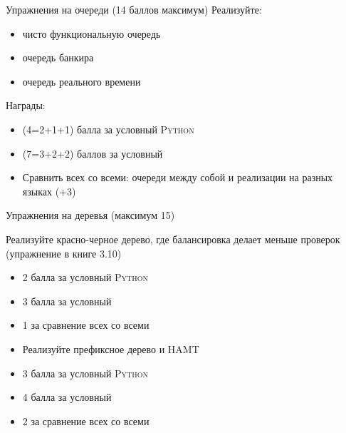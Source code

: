 \begin{frame}{Упражнения на очереди (14 баллов максимум)}
Реализуйте:
\begin{itemize}
\item чисто функциональную очередь 
\item очередь банкира 
\item очередь реального времени 
\end{itemize}
Награды:
\begin{itemize}
\item (4=2+1+1) балла за условный \textsc{Python}
\item (7=3+2+2) баллов за условный \OCaml{}
\item Сравнить всех со всеми: очереди между собой и реализации на разных языках (+3)
\end{itemize}
\end{frame}


%
%
%


\begin{frame}{Упражнения на деревья (максимум 15)}
\begin{exercise}
Реализуйте красно-черное дерево, где балансировка делает меньше проверок (упражнение в книге 3.10) \\
\begin{itemize}
\item 2 балла за условный \textsc{Python}
\item 3 балла за условный \OCaml{}
\item 1 за сравнение всех со всеми
\end{itemize}
\end{exercise}
\begin{exercise}
\begin{itemize}
\item Реализуйте префиксное дерево и HAMT
\item 3 балла за условный \textsc{Python}
\item 4 балла за условный \OCaml{}
\item 2 за сравнение всех со всеми
\end{itemize}
\end{exercise}
\end{frame}



